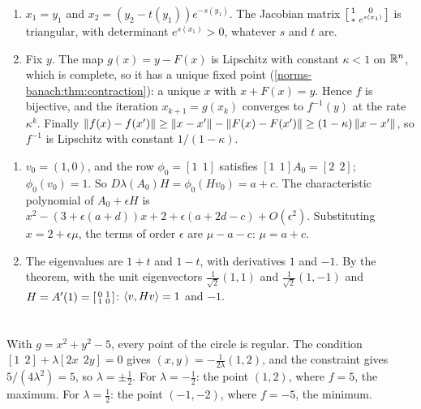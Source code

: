 \begin{enumerate}[nosep]
  \item $x_1 = y_1$ and $x_2 = (y_2 - t(y_1))e^{-s(y_1)}$. The Jacobian
        matrix
        $\begin{bsmallmatrix}1 & 0\\\ast & e^{s(x_1)}\end{bsmallmatrix}$
        is triangular, with determinant $e^{s(x_1)} > 0$, whatever $s$
        and $t$ are.
  \item Fix $y$. The map $g(x) = y - F(x)$ is Lipschitz with constant
        $\kappa < 1$ on $\mathbb{R}^n$, which is complete, so it has a unique
        fixed point (\cref{norms-banach:thm:contraction}): a unique $x$
        with $x + F(x) = y$. Hence $f$ is bijective, and the iteration
        $x_{k+1} = g(x_k)$ converges to $f^{-1}(y)$ at the rate
        $\kappa^k$. Finally
        $\left\|f(x) - f(x')\right\|\geq\left\|x - x'\right\| - \left\|F(x) - F(x')\right\|
        \geq(1 - \kappa)\left\|x - x'\right\|$, so $f^{-1}$ is Lipschitz with
        constant $1/(1 - \kappa)$.
\end{enumerate}

\begin{enumerate}[nosep]
  \item $v_0 = (1, 0)$, and the row $\phi_0 = [1\ \ 1]$ satisfies
        $[1\ \ 1]A_0 = [2\ \ 2]$; $\phi_0(v_0) = 1$. So
        $D\lambda(A_0)H = \phi_0(Hv_0) = a + c$. The characteristic
        polynomial of $A_0 + \epsilon H$ is
        $x^2 - (3 + \epsilon(a + d))x + 2 + \epsilon(a + 2d - c)
        + O(\epsilon^2)$. Substituting $x = 2 + \epsilon\mu$, the terms
        of order $\epsilon$ are $\mu - a - c$: $\mu = a + c$.
  \item The eigenvalues are $1 + t$ and $1 - t$, with derivatives $1$
        and $-1$. By the theorem, with the unit eigenvectors
        $\frac1{\sqrt2}(1, 1)$ and $\frac1{\sqrt2}(1, -1)$ and
        $H = A'(1) = \begin{bsmallmatrix}0 & 1\\ 1 & 0
        \end{bsmallmatrix}$: $\left\langle v, Hv \right\rangle = 1$ and $-1$.
\end{enumerate}

\section{}

With $g = x^2 + y^2 - 5$, every point of the circle is regular. The
condition $[1\ \ 2] + \lambda[2x\ \ 2y] = 0$ gives
$(x, y) = -\frac1{2\lambda}(1, 2)$, and the constraint gives
$5/(4\lambda^2) = 5$, so $\lambda = \pm\frac12$. For
$\lambda = -\frac12$: the point $(1, 2)$, where $f = 5$, the maximum.
For $\lambda = \frac12$: the point $(-1, -2)$, where $f = -5$, the
minimum.

